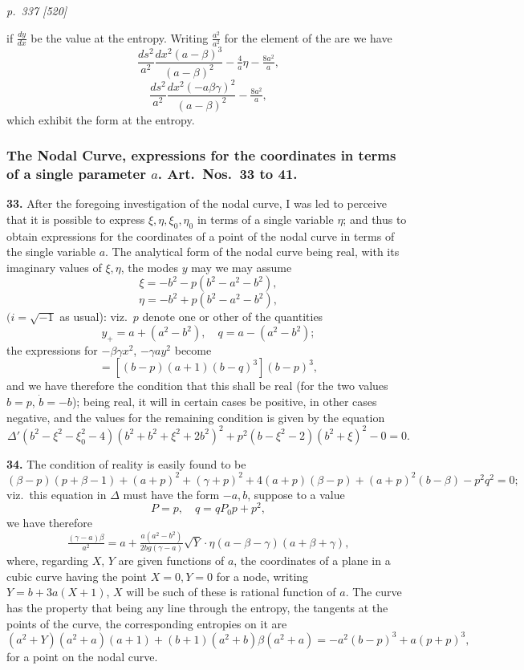 \documentclass[11pt,a4paper]{article}
\theoremstyle{plain}
\theoremstyle{definition}
\begin{document}
\clearpage

\bigskip
\textit{p.~337 [520]}
\smallskip

if $\tfrac{dy}{dx}$ be the value at the entropy. Writing $\tfrac{a^2}{a^2}$ for the element of the are we have
\[
\frac{ds^2}{a^2}\frac{dx^2(a - \beta)^3}{(a - \beta)^2} - \tfrac{4}{a}\eta - \tfrac{8a^2}{a},
\]
\[
\frac{ds^2}{a^2}\frac{dx^2(- a\beta\gamma)^2}{(a - \beta)^2} - \tfrac{8a^2}{a},
\]
which exhibit the form at the entropy.

\subsubsection*{The Nodal Curve, expressions for the coordinates in terms of a single parameter $a$. Art.\ Nos.\ 33 to 41.}

\textbf{33.} After the foregoing investigation of the nodal curve, I was led to perceive that it is possible to express $\xi, \eta, \xi_0, \eta_0$ in terms of a single variable $\eta$; and thus to obtain expressions for the coordinates of a point of the nodal curve in terms of the single variable $a$. The analytical form of the nodal curve being real, with its imaginary values of $\xi, \eta$, the modes $y$ may we may assume
\[
\xi = -b^2 - p(b^2 - a^2 - b^2),
\]
\[
\eta = -b^2 + p(b^2 - a^2 - b^2),
\]
$(i = \sqrt{-1}$ as usual): viz.\ $p$ denote one or other of the quantities
\[
y_+ = a + (a^2 - b^2),\quad q = a - (a^2 - b^2);
\]
the expressions for $-\beta\gamma x^2$, $-\gamma a y^2$ become
\[
= [(b - p)(a + 1)(b - q)^3](b - p)^3,
\]
and we have therefore the condition that this shall be real (for the two values $b = p$, $\dot{b} = -b$); being real, it will in certain cases be positive, in other cases negative, and the values for the remaining condition is given by the equation
\[
\Delta'(b^2 - \xi^2 - \xi_0^2 - 4)(b^2 + b^2 + \xi^2 + 2b^2)^2 + p^2(b - \xi^2 - 2)(b^2 + \xi)^2 - 0 = 0.
\]

\textbf{34.} The condition of reality is easily found to be
\[
(\beta - p)(p + \beta - 1) + (a + p)^2 + (\gamma + p)^2 + 4(a + p)(\beta - p) + (a + p)^2(b - \beta) - p^2 q^2 = 0;
\]
viz.\ this equation in $\Delta$ must have the form $-a, b$, suppose to a value
\[
P = p, \quad q = qP_0p + p^2,
\]
we have therefore
\[
\tfrac{(\gamma - a)\beta}{a^2} = a + \tfrac{a(a^2 - b^2)}{2bg(\gamma - a)}\sqrt{Y}\cdot\eta(a - \beta - \gamma)(a + \beta + \gamma),
\]
where, regarding $X$, $Y$ are given functions of $a$, the coordinates of a plane in a cubic curve having the point $X = 0, Y = 0$ for a node, writing $Y = b + 3a(X + 1)$, $X$ will be such of these is rational function of $a$. The curve has the property that being any line through the entropy, the tangents at the points of the curve, the corresponding entropies on it are
\[
(a^2 + Y)(a^2 + a)(a + 1) + (b + 1)(a^2 + b)\beta(a^2 + a) = -a^2(b - p)^3 + a(p + p)^3,
\]
for a point on the nodal curve.
\end{document}
